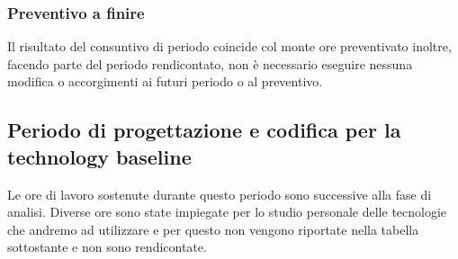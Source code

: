 \subsubsection{Preventivo a finire}
Il risultato del consuntivo di periodo coincide col monte ore preventivato inoltre, facendo parte del periodo rendicontato, non è necessario eseguire nessuna modifica o accorgimenti ai futuri periodo o al preventivo.

\subsection{Periodo di progettazione e codifica per la technology baseline}
Le ore di lavoro sostenute durante questo periodo sono successive alla fase di analisi. Diverse ore sono state impiegate per lo studio personale delle tecnologie che andremo ad utilizzare e per questo non vengono riportate nella tabella sottostante e non sono rendicontate.


